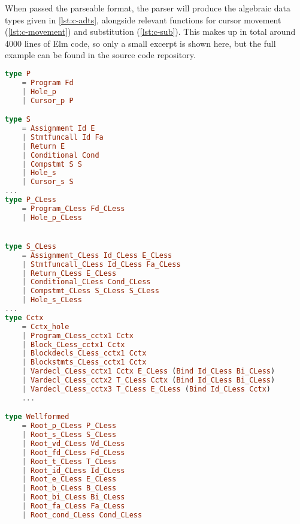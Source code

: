When passed the parseable format, the parser will produce the algebraic data types
given in \cref{lst:c-adts}, alongside relevant functions for cursor movement (\cref{lst:c-movement})
and substitution (\cref{lst:c-sub}). This makes up in total around 4000 lines of Elm code,
so only a small excerpt is shown here, but the full example can be found in the source
code repository.

\begin{lstlisting}[style=inline, language=elm, caption={Generated ADT for the C language}, label={lst:c-adts}]
type P
    = Program Fd
    | Hole_p
    | Cursor_p P

type S
    = Assignment Id E
    | Stmtfuncall Id Fa
    | Return E
    | Conditional Cond
    | Compstmt S S
    | Hole_s
    | Cursor_s S
...
type P_CLess
    = Program_CLess Fd_CLess
    | Hole_p_CLess


type S_CLess
    = Assignment_CLess Id_CLess E_CLess
    | Stmtfuncall_CLess Id_CLess Fa_CLess
    | Return_CLess E_CLess
    | Conditional_CLess Cond_CLess
    | Compstmt_CLess S_CLess S_CLess
    | Hole_s_CLess
...
type Cctx
    = Cctx_hole
    | Program_CLess_cctx1 Cctx
    | Block_CLess_cctx1 Cctx
    | Blockdecls_CLess_cctx1 Cctx
    | Blockstmts_CLess_cctx1 Cctx
    | Vardecl_CLess_cctx1 Cctx E_CLess (Bind Id_CLess Bi_CLess)
    | Vardecl_CLess_cctx2 T_CLess Cctx (Bind Id_CLess Bi_CLess)
    | Vardecl_CLess_cctx3 T_CLess E_CLess (Bind Id_CLess Cctx)
    ...

type Wellformed
    = Root_p_CLess P_CLess
    | Root_s_CLess S_CLess
    | Root_vd_CLess Vd_CLess
    | Root_fd_CLess Fd_CLess
    | Root_t_CLess T_CLess
    | Root_id_CLess Id_CLess
    | Root_e_CLess E_CLess
    | Root_b_CLess B_CLess
    | Root_bi_CLess Bi_CLess
    | Root_fa_CLess Fa_CLess
    | Root_cond_CLess Cond_CLess
\end{lstlisting}

